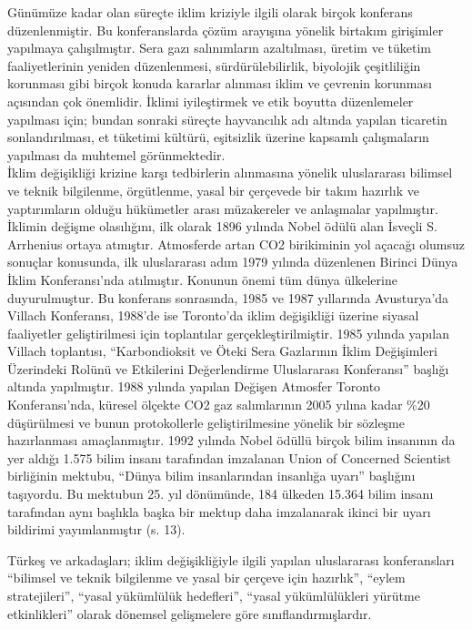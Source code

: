 \documentclass[
]{book}
\begin{document}
Günümüze kadar olan süreçte iklim kriziyle ilgili olarak birçok konferans düzenlenmiştir. Bu konferanslarda çözüm arayışına yönelik birtakım girişimler yapılmaya çalışılmıştır. Sera gazı salınımların azaltılması, üretim ve tüketim faaliyetlerinin yeniden düzenlenmesi, sürdürülebilirlik, biyolojik çeşitliliğin korunması gibi birçok konuda kararlar alınması iklim ve çevrenin korunması açısından çok önemlidir. İklimi iyileştirmek ve etik boyutta düzenlemeler yapılması için; bundan sonraki süreçte hayvancılık adı altında yapılan ticaretin sonlandırılması, et tüketimi kültürü, eşitsizlik üzerine kapsamlı çalışmaların yapılması da muhtemel görünmektedir.\\
İklim değişikliği krizine karşı tedbirlerin alınmasına yönelik uluslararası bilimsel ve teknik bilgilenme, örgütlenme, yasal bir çerçevede bir takım hazırlık ve yaptırımların olduğu hükümetler arası müzakereler ve anlaşmalar yapılmıştır. İklimin değişme olasılığını, ilk olarak 1896 yılında Nobel ödülü alan İsveçli S. Arrhenius ortaya atmıştır. Atmosferde artan CO2 birikiminin yol açacağı olumsuz sonuçlar konusunda, ilk uluslararası adım 1979 yılında düzenlenen Birinci Dünya İklim Konferansı'nda atılmıştır. Konunun önemi tüm dünya ülkelerine duyurulmuştur. Bu konferans sonrasında, 1985 ve 1987 yıllarında Avusturya'da Villach Konferansı, 1988'de ise Toronto'da iklim değişikliği üzerine siyasal faaliyetler geliştirilmesi için toplantılar gerçekleştirilmiştir. 1985 yılında yapılan Villach toplantısı, ``Karbondioksit ve Öteki Sera Gazlarının İklim Değişimleri Üzerindeki Rolünü ve Etkilerini Değerlendirme Uluslararası Konferansı'' başlığı altında yapılmıştır. 1988 yılında yapılan Değişen Atmosfer Toronto Konferansı'nda, küresel ölçekte CO2 gaz salımlarının 2005 yılına kadar \%20 düşürülmesi ve bunun protokollerle geliştirilmesine yönelik bir sözleşme hazırlanması amaçlanmıştır. \citep{turkes2001kuresel} 1992 yılında Nobel ödüllü birçok bilim insanının da yer aldığı 1.575 bilim insanı tarafından imzalanan Union of Concerned Scientist birliğinin mektubu, ``Dünya bilim insanlarından insanlığa uyarı'' başlığını taşıyordu. Bu mektubun 25. yıl dönümünde, 184 ülkeden 15.364 bilim insanı tarafından aynı başlıkla başka bir mektup daha imzalanarak ikinci bir uyarı bildirimi yayımlanmıştır (s. 13).\citep{harvey2016climate}

Türkeş ve arkadaşları; iklim değişikliğiyle ilgili yapılan uluslararası konferansları ``bilimsel ve teknik bilgilenme ve yasal bir çerçeve için hazırlık'', ``eylem stratejileri'', ``yasal yükümlülük hedefleri'', ``yasal yükümlülükleri yürütme etkinlikleri'' olarak dönemsel gelişmelere göre sınıflandırmışlardır.
\end{document}
